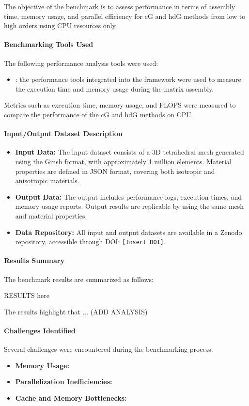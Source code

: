 The objective of the benchmark is to assess performance in terms of assembly time, memory usage, and parallel efficiency for cG and hdG methods from low to high orders using CPU resources only.

\paragraph{Benchmarking Tools Used}
The following performance analysis tools were used:
\begin{itemize}
    \item \textbf{\Feelpp}: the performance tools integrated into the \Feelpp framework were used to measure the execution time and memory usage during the matrix assembly.
\end{itemize}

Metrics such as execution time, memory usage, and FLOPS were measured to compare the performance of the cG and hdG methods on CPU.

\paragraph{Input/Output Dataset Description}
\begin{itemize}
    \item \textbf{Input Data:} The input dataset consists of a 3D tetrahedral mesh generated using the Gmsh format, with approximately 1 million elements. Material properties are defined in JSON format, covering both isotropic and anisotropic materials.

    \item \textbf{Output Data:} The output includes performance logs, execution times, and memory usage reports. Output results are replicable by using the same mesh and material properties.

    \item \textbf{Data Repository:} All input and output datasets are available in a Zenodo repository, accessible through DOI: \texttt{[Insert DOI]}.
\end{itemize}

\paragraph{Results Summary}
The benchmark results are summarized as follows:

RESULTS here

The results highlight that ... (ADD ANALYSIS)

\paragraph{Challenges Identified}
Several challenges were encountered during the benchmarking process:
\begin{itemize}
    \item \textbf{Memory Usage:}
    \item \textbf{Parallelization Inefficiencies:}
    \item \textbf{Cache and Memory Bottlenecks:}
\end{itemize}

